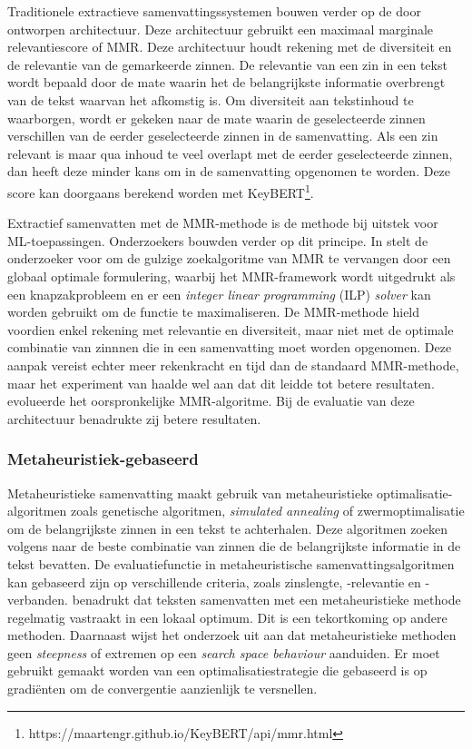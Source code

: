 Traditionele extractieve samenvattingssystemen bouwen verder op de door \textcite{Carbonell1998} ontworpen architectuur. Deze architectuur gebruikt een maximaal marginale relevantiescore of MMR. Deze architectuur houdt rekening met de diversiteit en de relevantie van de gemarkeerde zinnen. De relevantie van een zin in een tekst wordt bepaald door de mate waarin het de belangrijkste informatie overbrengt van de tekst waarvan het afkomstig is. Om diversiteit aan tekstinhoud te waarborgen, wordt er gekeken naar de mate waarin de geselecteerde zinnen verschillen van de eerder geselecteerde zinnen in de samenvatting. Als een zin relevant is maar qua inhoud te veel overlapt met de eerder geselecteerde zinnen, dan heeft deze minder kans om in de samenvatting opgenomen te worden. Deze score kan doorgaans berekend worden met KeyBERT\footnote{https://maartengr.github.io/KeyBERT/api/mmr.html}.

Extractief samenvatten met de MMR-methode is de methode bij uitstek voor ML-toepassingen. Onderzoekers bouwden verder op dit principe. In \textcite{McDonald2007} stelt de onderzoeker voor om de gulzige zoekalgoritme van MMR te vervangen door een globaal optimale formulering, waarbij het MMR-framework wordt uitgedrukt als een knapzakprobleem en er een \textit{integer linear programming} (ILP) \textit{solver} kan worden gebruikt om de functie te maximaliseren. De MMR-methode hield voordien enkel rekening met relevantie en diversiteit, maar niet met de optimale combinatie van zinnnen die in een samenvatting moet worden opgenomen. Deze aanpak vereist echter meer rekenkracht en tijd dan de standaard MMR-methode, maar het experiment van \textcite{McDonald2007} haalde wel aan dat dit leidde tot betere resultaten. \textcite{Lin2010} evolueerde het oorspronkelijke MMR-algoritme. Bij de evaluatie van deze architectuur benadrukte zij betere resultaten. 

\subsubsection{Metaheuristiek-gebaseerd}

Metaheuristieke samenvatting maakt gebruik van metaheuristieke optimalisatie-algoritmen zoals genetische algoritmen, \textit{simulated annealing} of zwermoptimalisatie om de belangrijkste zinnen in een tekst te achterhalen. Deze algoritmen zoeken volgens \textcite{Verma2020, Premjith2015} naar de beste combinatie van zinnen die de belangrijkste informatie in de tekst bevatten. De evaluatiefunctie in metaheuristische samenvattingsalgoritmen kan gebaseerd zijn op verschillende criteria, zoals zinslengte, -relevantie en -verbanden. \textcite{Rani2021} benadrukt dat teksten samenvatten met een metaheuristieke methode regelmatig vastraakt in een lokaal optimum. Dit is een tekortkoming op andere methoden. Daarnaast wijst het onderzoek uit aan dat metaheuristieke methoden geen \textit{steepness} of extremen op een \textit{search space behaviour} aanduiden. Er moet gebruikt gemaakt worden van een optimalisatiestrategie die gebaseerd is op gradiënten om de convergentie aanzienlijk te versnellen.

